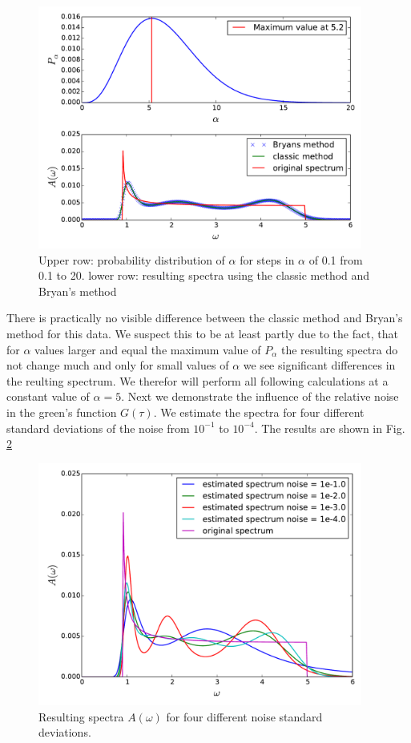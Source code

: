\begin{figure}[htbp]
	\centering
	\includegraphics[width=0.95\textwidth]{./images/BCS_Bryan_classic_p_alpha.pdf}
	\caption{Upper row: probability distribution of $\alpha$ for steps in $\alpha$ of 0.1 from 0.1 to 20. lower row: resulting spectra using the classic method and Bryan's method}
	\label{results:fig.4}
\end{figure}
\FloatBarrier
There is practically no visible difference between the classic method and Bryan's method for this data. We suspect this to be at least partly due to the fact, that for $\alpha$ values larger and equal the maximum value of $P_{\alpha}$ the resulting spectra do not change much and only for small values of $\alpha$ we see significant differences in the reulting spectrum. We therefor will perform all following calculations at a constant value of $\alpha = 5$.\newline
Next we demonstrate the influence of the relative noise in the green's function $G(\tau)$. We estimate the spectra for four different standard deviations of the noise from $10^{-1}$ to $10^{-4}$. The results are shown in Fig. \ref{results:fig_5}
\begin{figure}[htbp]
	\centering
	\includegraphics[width=0.95\textwidth]{./images/BCS_varying_noise.pdf}
	\caption{Resulting spectra $A(\omega)$ for four different noise standard deviations.}
	\label{results:fig_5}
\end{figure}
